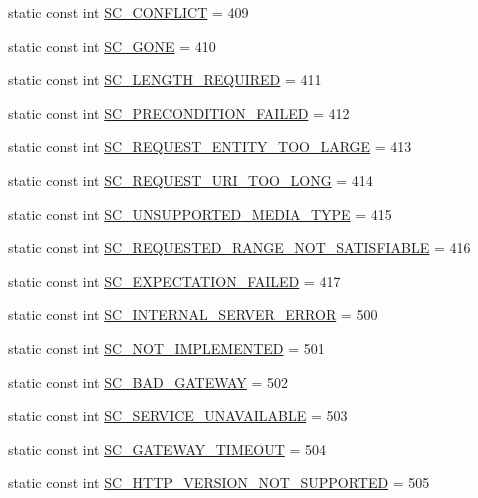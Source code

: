 \begin{DoxyCompactItemize}
\item 
static const int \hyperlink{class_http_servlet_response_a7ab66eb85cdf1f82dbaa05c4fa174f51}{S\+C\+\_\+\+C\+O\+N\+F\+L\+I\+CT} = 409
\item 
static const int \hyperlink{class_http_servlet_response_a63390c4a11859e6f638cedfeb34e05e2}{S\+C\+\_\+\+G\+O\+NE} = 410
\item 
static const int \hyperlink{class_http_servlet_response_aa92564f0261fc9ad79af73d9f5768f36}{S\+C\+\_\+\+L\+E\+N\+G\+T\+H\+\_\+\+R\+E\+Q\+U\+I\+R\+ED} = 411
\item 
static const int \hyperlink{class_http_servlet_response_a92df03e647616e83e5cde10ebd423619}{S\+C\+\_\+\+P\+R\+E\+C\+O\+N\+D\+I\+T\+I\+O\+N\+\_\+\+F\+A\+I\+L\+ED} = 412
\item 
static const int \hyperlink{class_http_servlet_response_a257564cdbe543f536fc5c2fdc63e4c2c}{S\+C\+\_\+\+R\+E\+Q\+U\+E\+S\+T\+\_\+\+E\+N\+T\+I\+T\+Y\+\_\+\+T\+O\+O\+\_\+\+L\+A\+R\+GE} = 413
\item 
static const int \hyperlink{class_http_servlet_response_a29f723e32b2cddb7c7fe2849b294c059}{S\+C\+\_\+\+R\+E\+Q\+U\+E\+S\+T\+\_\+\+U\+R\+I\+\_\+\+T\+O\+O\+\_\+\+L\+O\+NG} = 414
\item 
static const int \hyperlink{class_http_servlet_response_af55bcf82a105cf67cdd2cab4eb90aeb4}{S\+C\+\_\+\+U\+N\+S\+U\+P\+P\+O\+R\+T\+E\+D\+\_\+\+M\+E\+D\+I\+A\+\_\+\+T\+Y\+PE} = 415
\item 
static const int \hyperlink{class_http_servlet_response_a1e8d6fd9ee1a811b56a37fae277a44e7}{S\+C\+\_\+\+R\+E\+Q\+U\+E\+S\+T\+E\+D\+\_\+\+R\+A\+N\+G\+E\+\_\+\+N\+O\+T\+\_\+\+S\+A\+T\+I\+S\+F\+I\+A\+B\+LE} = 416
\item 
static const int \hyperlink{class_http_servlet_response_ad016ef8732d38ae6ee05a9dd83dddff8}{S\+C\+\_\+\+E\+X\+P\+E\+C\+T\+A\+T\+I\+O\+N\+\_\+\+F\+A\+I\+L\+ED} = 417
\item 
static const int \hyperlink{class_http_servlet_response_a0aac7f8bb706e75f4cbc0ad89c2197d1}{S\+C\+\_\+\+I\+N\+T\+E\+R\+N\+A\+L\+\_\+\+S\+E\+R\+V\+E\+R\+\_\+\+E\+R\+R\+OR} = 500
\item 
static const int \hyperlink{class_http_servlet_response_a29bbe265aa6c97ddde0110e707e5e027}{S\+C\+\_\+\+N\+O\+T\+\_\+\+I\+M\+P\+L\+E\+M\+E\+N\+T\+ED} = 501
\item 
static const int \hyperlink{class_http_servlet_response_a0f3a889cde6396de96e648aa4c49b84e}{S\+C\+\_\+\+B\+A\+D\+\_\+\+G\+A\+T\+E\+W\+AY} = 502
\item 
static const int \hyperlink{class_http_servlet_response_aded2fd25e5c594b345740b3f11caa8a9}{S\+C\+\_\+\+S\+E\+R\+V\+I\+C\+E\+\_\+\+U\+N\+A\+V\+A\+I\+L\+A\+B\+LE} = 503
\item 
static const int \hyperlink{class_http_servlet_response_afe4365a66d7eac9fa8db90089bb76b6b}{S\+C\+\_\+\+G\+A\+T\+E\+W\+A\+Y\+\_\+\+T\+I\+M\+E\+O\+UT} = 504
\item 
static const int \hyperlink{class_http_servlet_response_ad63dea43b964dbd3ad326f976f001048}{S\+C\+\_\+\+H\+T\+T\+P\+\_\+\+V\+E\+R\+S\+I\+O\+N\+\_\+\+N\+O\+T\+\_\+\+S\+U\+P\+P\+O\+R\+T\+ED} = 505
\end{DoxyCompactItemize}


